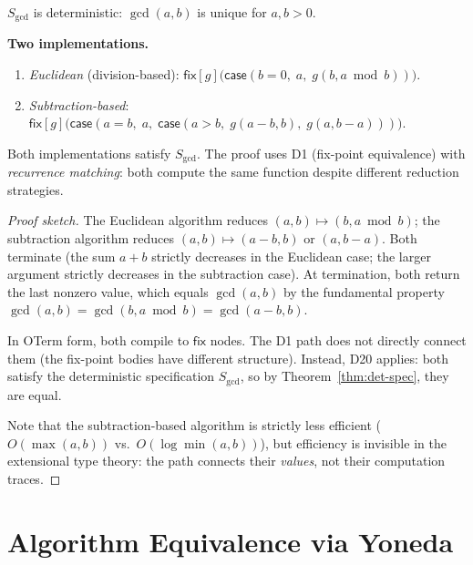 \begin{proposition}
$S_{\gcd}$ is deterministic: $\gcd(a, b)$ is unique for $a, b > 0$.
\end{proposition}

\noindent\textbf{Two implementations.}
\begin{enumerate}
  \item \emph{Euclidean} (division-based):
    $\mathsf{fix}[g]\bigl(\mathsf{case}(b = 0,\; a,\;
      g(b, a \bmod b))\bigr)$.
  \item \emph{Subtraction-based}:
    $\mathsf{fix}[g]\bigl(\mathsf{case}(a = b,\; a,\;
      \mathsf{case}(a > b,\; g(a{-}b, b),\; g(a, b{-}a)))\bigr)$.
\end{enumerate}

\begin{theorem}
Both implementations satisfy $S_{\gcd}$.  The proof uses D1
(fix-point equivalence) with \emph{recurrence matching}:
both compute the same function despite different reduction strategies.
\end{theorem}

\begin{proof}[Proof sketch]
The Euclidean algorithm reduces $(a, b) \mapsto (b, a \bmod b)$;
the subtraction algorithm reduces
$(a, b) \mapsto (a - b, b)$ or $(a, b - a)$.
Both terminate (the sum $a + b$ strictly decreases in the
Euclidean case; the larger argument strictly decreases in the
subtraction case).  At termination, both return the last nonzero
value, which equals $\gcd(a, b)$ by the fundamental property
$\gcd(a, b) = \gcd(b, a \bmod b) = \gcd(a - b, b)$.

In OTerm form, both compile to $\mathsf{fix}$ nodes.  The D1
path does not directly connect them (the fix-point bodies have
different structure).  Instead, D20 applies: both satisfy the
deterministic specification $S_{\gcd}$, so by
Theorem~\ref{thm:det-spec}, they are equal.

Note that the subtraction-based algorithm is strictly less
efficient ($O(\max(a,b))$ vs.\ $O(\log \min(a,b))$), but
efficiency is invisible in the extensional type theory: the
path connects their \emph{values}, not their computation traces.
\end{proof}


\section{Algorithm Equivalence via Yoneda}
\label{sec:yoneda-algo}

